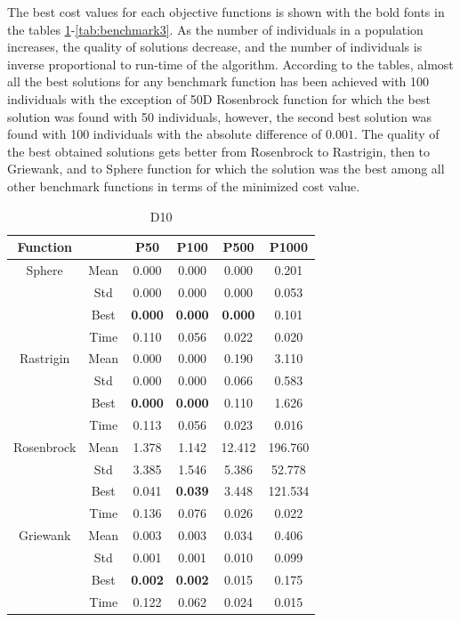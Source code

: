 \documentclass[conference]{IEEEtran}
\begin{document}
The best cost values for each objective functions is shown with the bold fonts in the tables \ref{tab:benchmark}-\ref{tab:benchmark3}. As the number of individuals in a population increases, the quality 
of solutions decrease, and the number of individuals is inverse proportional to run-time of the algorithm. According to the tables, almost all the best solutions for any benchmark function has been 
achieved with 100 individuals with the exception of 50D Rosenbrock function for which the best solution was found with 50 individuals, however, the second best solution was found with 100 individuals 
with the absolute difference of $0.001$. The quality of the best obtained solutions gets better from Rosenbrock to Rastrigin, then to Griewank, and to Sphere function for which the solution was the best 
among all other benchmark functions in terms of the minimized cost value.

\begin{table}[h]
	\centering
	\begin{tabular}{|c|c|c|c|c|c|}
		\hline
		\textbf{Function} & & \textbf{P50} & \textbf{P100} & \textbf{P500} & \textbf{P1000} \\
		\hline
		Sphere 			& Mean & 0.000 & 0.000 & 0.000 & 0.201 \\
						& Std & 0.000 & 0.000 & 0.000 & 0.053 \\
						& Best & \textbf{0.000} & \textbf{0.000} & \textbf{0.000} & 0.101 \\
						& Time & 0.110 & 0.056 & 0.022 & 0.020 \\
		\hline
		Rastrigin 		& Mean & 0.000 & 0.000 & 0.190 & 3.110 \\
						& Std & 0.000 & 0.000 & 0.066 & 0.583 \\
						& Best & \textbf{0.000} & \textbf{0.000} & 0.110 & 1.626 \\
						& Time & 0.113 & 0.056 & 0.023 & 0.016 \\
		\hline
		Rosenbrock 		& Mean & 1.378 & 1.142 & 12.412 & 196.760 \\
						& Std & 3.385 & 1.546 & 5.386 & 52.778 \\
						& Best & 0.041 & \textbf{0.039} & 3.448 & 121.534 \\
						& Time & 0.136 & 0.076 & 0.026 & 0.022 \\
		\hline
		Griewank 		& Mean & 0.003 & 0.003 & 0.034 & 0.406 \\
						& Std & 0.001 & 0.001 & 0.010 & 0.099 \\
						& Best & \textbf{0.002} & \textbf{0.002} & 0.015 & 0.175 \\
						& Time & 0.122 & 0.062 & 0.024 & 0.015 \\
		\hline
	\end{tabular}
	\caption{D10}
	\label{tab:benchmark}
\end{table}
\end{document}
